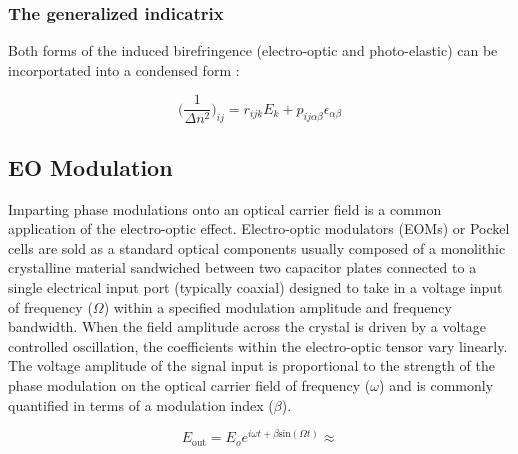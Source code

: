 \subsubsection{The generalized indicatrix}
Both forms of the induced birefringence (electro-optic and photo-elastic) can be incorportated into a condensed form \cite{nye}:

\begin{equation}\label{eq:indicgen}
	\bigg( \frac{1}{\Delta n^2} \bigg)_{ij} = r_{ijk}E_k + p_{ij \alpha \beta} \epsilon_{\alpha \beta}
\end{equation}



\subsection{EO Modulation}\label{sec:EOM}
Imparting phase modulations onto an optical carrier field is a common application of the electro-optic effect. Electro-optic modulators (EOMs) or Pockel cells are sold as a standard optical components usually composed of a monolithic crystalline material sandwiched between two capacitor plates connected to a single electrical input port (typically coaxial) designed to take in a voltage input of frequency ($\Omega$) within a specified modulation amplitude and frequency bandwidth. When the field amplitude across the crystal is driven by a voltage controlled oscillation, the coefficients within the electro-optic tensor vary linearly. The voltage amplitude of the signal input is proportional to the strength of the phase modulation on the optical carrier field of frequency ($\omega$) and is commonly quantified in terms of a modulation index ($\beta$).


\begin{equation}\label{eq:inp_EOM}
E_\mathrm{out} = E_o e^{i \omega t + \beta \mathrm{sin}( \Omega t)} \approx
\end{equation}

